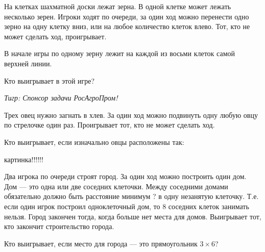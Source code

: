 \begin{problem}
На клетках шахматной доски лежат зерна. В одной клетке может лежать несколько зерен. Игроки ходят по очереди, за один ход можно перенести одно зерно на одну клетку вниз, или на любое количество клеток влево. Тот, кто не может сделать ход, проигрывает.\par
В начале игры по одному зерну лежит на каждой из восьми клеток самой верхней линии.\par
Кто выигрывает в этой игре?\par
{\it Тигр: Спонсор задачи РосАгроПром!}



\begin{sol}

\end{sol}
\end{problem}




\begin{problem}
Трех овец нужно загнать в хлев. За один ход можно подвинуть одну любую овцу по стрелочке один раз. Проигрывает тот, кто не может сделать ход. \par
Кто выигрывает, если изначально овцы расположены так:


{\red картинка!!!!!!}



\begin{sol}

\end{sol}
\end{problem}



\begin{problem}

Два игрока по очереди строят город. За один ход можно построить один дом. Дом — это одна или две соседних клеточки. Между соседними домами обязательно должно быть расстояние минимум {\red ?} в одну незанятую клеточку. Т.е. если один игрок построил одноклеточный дом, то 8 соседних клеток занимать нельзя. Город закончен тогда, когда больше нет места для домов. Выигрывает тот, кто закончит строительство города.

Кто выигрывает, если место для города — это прямоугольник $3\times 6$?



\begin{sol}

\end{sol}
\end{problem}




